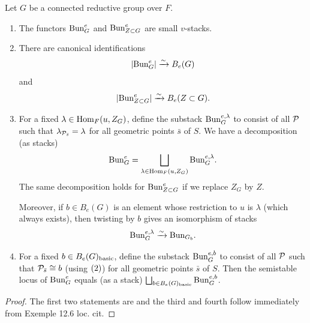 \begin{prop}\label{prop:BunGestructure}
Let $G$ be a connected reductive group over $F$.
    \begin{enumerate}
       \item{The functors  $\mathrm{Bun}_{G}^{e}$ and  $\mathrm{Bun}_{Z \subset G}^{e}$ are small $v$-stacks.}
       \item{There are canonical identifications
       \begin{equation*}
           |\mathrm{Bun}_{G}^{e}| \xrightarrow{\sim} B_{e}(G)
       \end{equation*}
       and
       \begin{equation*}
            |\mathrm{Bun}_{Z \subset G}^{e}| \xrightarrow{\sim} B_{e}(Z \subset G).
       \end{equation*}       
       }
       \item{For a fixed $\lambda \in \mathrm{Hom}_{F}(u, Z_{G})$, define the substack $\mathrm{Bun}_{G}^{e,\lambda}$ to consist of all $\mathcal{P}$ such that $\lambda_{\mathcal{P}_{\bar{s}}} = \lambda$ for all geometric points $\bar{s}$ of $S$. We have a decomposition (as stacks)
       \begin{equation*}
           \mathrm{Bun}_{G}^{e} = \bigsqcup_{\lambda \in \mathrm{Hom}_{F}(u,Z_{G})} \mathrm{Bun}_{G}^{e,\lambda}.
       \end{equation*}
       The same decomposition holds for $\mathrm{Bun}_{Z \subset G}^{e}$ if we replace $Z_{G}$ by $Z$.

       Moreover, if $b \in B_{e}(G)$ is an element whose restriction to $u$ is $\lambda$ (which always exists), then twisting by $b$ gives an isomorphism of stacks
       \begin{equation*}
           \mathrm{Bun}_{G}^{e,\lambda} \xrightarrow{\sim} \mathrm{Bun}_{G_{b}}.
       \end{equation*}
       }
\item{For a fixed $b \in B_{e}(G)_{\textnormal{basic}}$, define the substack $\mathrm{Bun}_{G}^{e,b}$ to consist of all $\mathcal{P}$ such that $\mathcal{P}_{\bar{s}} \cong b$ (using $\textnormal{(2)}$) for all geometric points $\bar{s}$ of $S$. Then the semistable locus of $\mathrm{Bun}_{G}^{e}$ equals (as a stack) $\bigsqcup_{b \in B_{e}(G)_{\textnormal{basic}}}\mathrm{Bun}_{G}^{e,b}$.}

    \end{enumerate}
\end{prop}

\begin{proof}
    The first two statements are \cite[Proposition 12.5]{Fargues22} and the third and fourth follow immediately from Exemple 12.6 loc. cit.
\end{proof}

